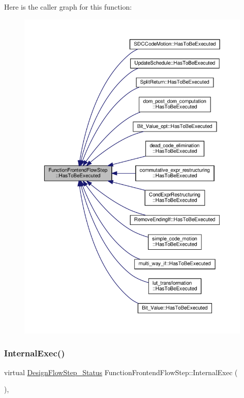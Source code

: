 Here is the caller graph for this function\+:
\nopagebreak
\begin{figure}[H]
\begin{center}
\leavevmode
\includegraphics[width=350pt]{d8/d0a/classFunctionFrontendFlowStep_a12e786363530aa9533e4bd9380130d75_icgraph}
\end{center}
\end{figure}
\mbox{\label{classFunctionFrontendFlowStep_a00612f7fb9eabbbc8ee7e39d34e5ac68}} 
\subsubsection{\texorpdfstring{Internal\+Exec()}{InternalExec()}}
{\footnotesize\ttfamily virtual \hyperlink{design__flow__step_8hpp_afb1f0d73069c26076b8d31dbc8ebecdf}{Design\+Flow\+Step\+\_\+\+Status} Function\+Frontend\+Flow\+Step\+::\+Internal\+Exec (\begin{DoxyParamCaption}{ }\end{DoxyParamCaption})\hspace{0.3cm}{\ttfamily [protected]}, {}}



